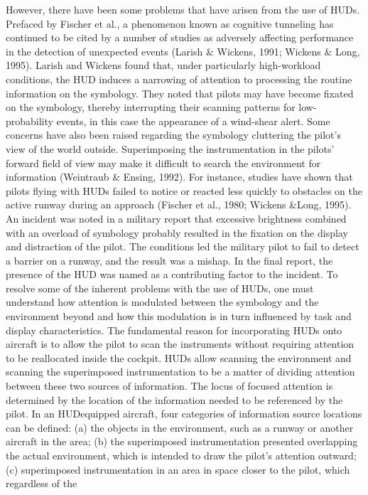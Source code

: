 \documentclass[utf8,bachelor,manualbib]{gradu3}
\begin{document}
However, there have been some problems that have arisen from the use of HUDs.
Prefaced by Fischer et al., a phenomenon known as cognitive tunneling has
continued to be cited by a number of studies as adversely affecting performance in
the detection of unexpected events (Larish \& Wickens, 1991; Wickens \& Long,
1995). Larish and Wickens found that, under particularly high-workload conditions,
the HUD induces a narrowing of attention to processing the routine information
on the symbology. They noted that pilots may have become fixated on the
symbology, thereby interrupting their scanning patterns for low-probability events,
in this case the appearance of a wind-shear alert.
Some concerns have also been raised regarding the symbology cluttering the
pilot's view of the world outside. Superimposing the instrumentation in the pilots'
forward field of view may make it difficult to search the environment for information
(Weintraub \& Ensing, 1992). For instance, studies have shown that pilots flying
with HUDs failed to notice or reacted less quickly to obstacles on the active runway
during an approach (Fischer et al., 1980; Wickens \&Long, 1995). An incident was
noted in a military report that excessive brightness combined with an overload of
symbology probably resulted in the fixation on the display and distraction of the
pilot. The conditions led the military pilot to fail to detect a barrier on a runway,
and the result was a mishap. In the final report, the presence of the HUD was named
as a contributing factor to the incident.
To resolve some of the inherent problems with the use of HUDs, one must
understand how attention is modulated between the symbology and the environment
beyond and how this modulation is in turn influenced by task and display
characteristics. The fundamental reason for incorporating HUDs onto aircraft is to
allow the pilot to scan the instruments without requiring attention to be reallocated
inside the cockpit. HUDs allow scanning the environment and scanning the
superimposed instrumentation to be a matter of dividing attention between these
two sources of information. The locus of focused attention is determined by the
location of the information needed to be referenced by the pilot. In an HUDequipped
aircraft, four categories of information source locations can be defined:
(a) the objects in the environment, such as a runway or another aircraft in the area;
(b) the superimposed instrumentation presented overlapping the actual environment,
which is intended to draw the pilot's attention outward; (c) superimposed
instrumentation in an area in space closer to the pilot, which regardless of the
\end{document}
